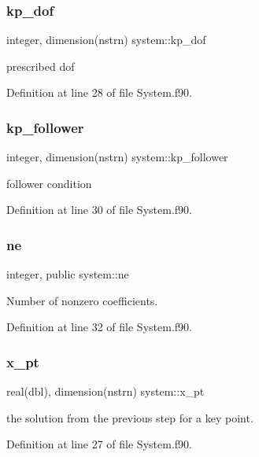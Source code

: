 \mbox{\label{namespacesystem_a1ec6fa7d33c56b907f960706f2c49a97}} 
\subsubsection{\texorpdfstring{kp\+\_\+dof}{kp\_dof}}
{\footnotesize\ttfamily integer, dimension(nstrn) system\+::kp\+\_\+dof\hspace{0.3cm}{\ttfamily [private]}}



prescribed dof 



Definition at line 28 of file System.\+f90.

\mbox{\label{namespacesystem_af7b15e252e65635b4d03452e4c717697}} 
\subsubsection{\texorpdfstring{kp\+\_\+follower}{kp\_follower}}
{\footnotesize\ttfamily integer, dimension(nstrn) system\+::kp\+\_\+follower\hspace{0.3cm}{\ttfamily [private]}}



follower condition 



Definition at line 30 of file System.\+f90.

\mbox{\label{namespacesystem_a8c97c1868622a50b42869db23d0a2f11}} 
\subsubsection{\texorpdfstring{ne}{ne}}
{\footnotesize\ttfamily integer, public system\+::ne}



Number of nonzero coefficients. 



Definition at line 32 of file System.\+f90.

\mbox{\label{namespacesystem_a9db5b0f39df1dc763bd7885fa9f4389d}} 
\subsubsection{\texorpdfstring{x\+\_\+pt}{x\_pt}}
{\footnotesize\ttfamily real(dbl), dimension(nstrn) system\+::x\+\_\+pt\hspace{0.3cm}{\ttfamily [private]}}



the solution from the previous step for a key point. 



Definition at line 27 of file System.\+f90.

